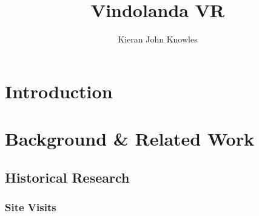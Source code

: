 \documentclass[sigconf,authordraft]{acmart}
\author{Kieran John Knowles}
\affiliation{%
  \institution{Newcastle University}
  \city{Newcastle Upon Tyne}
  \country{United Kingdom}
}
\begin{document}
\title{Vindolanda VR}

\begin{abstract}
\end{abstract}

\begin{CCSXML}
\end{CCSXML}




\maketitle

\section{Introduction}

\section{Background \& Related Work}

\subsection{Historical Research}

\subsubsection{Site Visits}
\end{document}
